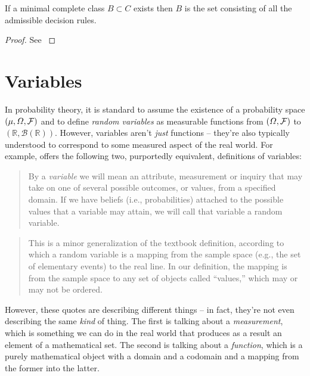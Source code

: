 \begin{theorem}
If a minimal complete class $B\subset C$ exists then $B$ is the set consisting of all the admissible decision rules.
\end{theorem}

\begin{proof}
See \citet[~chap. 2]{toutenburg_ferguson_1967}
\end{proof}



\section{Variables}\label{sec:variable}

In probability theory, it is standard to assume the existence of a probability space $(\mu,\Omega,\mathcal{F})$ and to define \emph{random variables} as measurable functions from $(\Omega,\mathcal{F})$ to $(\mathbb{R},\mathcal{B}(\mathbb{R}))$. However, variables aren't \emph{just} functions -- they're also typically understood to correspond to some measured aspect of the real world. For example, \citet{pearl_causality:_2009} offers the following two, purportedly equivalent, definitions of variables:
\begin{quote}
By a \emph{variable} we will mean an attribute, measurement or inquiry that may take on one of several possible outcomes, or values, from a specified domain. If we have beliefs (i.e., probabilities) attached to the possible values that a variable may attain, we will call that variable a random variable.
\end{quote}

\begin{quote}
This is a minor generalization of the textbook definition, according to which a random variable is a mapping from the sample space (e.g., the set of elementary events) to the real line. In our definition, the mapping is from the sample space to any set of objects called ``values,'' which may or may not be ordered.
\end{quote}

However, these quotes are describing different things -- in fact, they're not even describing the same \emph{kind} of thing. The first is talking about a \emph{measurement}, which is something we can do in the real world that produces as a result an element of a mathematical set. The second is talking about a \emph{function}, which is a purely mathematical object with a domain and a codomain and a mapping from the former into the latter.

